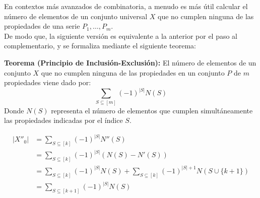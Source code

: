 \documentclass[12pt]{article}
\theoremstyle{definition}
\theoremstyle{plain}
\theoremstyle{plain}
\theoremstyle{definition}
\begin{document}
        En contextos más avanzados de combinatoria, a menudo es más útil calcular el número de elementos de un conjunto universal \(X\) que no cumplen ninguna de las propiedades de una serie \(P_1, \dots, P_m\).\\
        De modo que, la siguiente versión es equivalente a la anterior por el paso al complementario, y se formaliza mediante el siguiente teorema:

        \textbf{Teorema (Principio de Inclusión-Exclusión):}
        El número de elementos de un conjunto $X$ que no cumplen ninguna de las propiedades en un conjunto $P$ de $m$ propiedades viene dado por:$$\sum_{S \subseteq [m]} (-1)^{|S|} N(S)$$Donde $N(S)$ representa el número de elementos que cumplen simultáneamente las propiedades indicadas por el índice $S$.
        
        
        $$\begin{aligned}
            |X''_0| &= \sum_{S \subseteq [k]} (-1)^{|S|} N''(S) \\
            &= \sum_{S \subseteq [k]} (-1)^{|S|} (N(S) - N'(S)) \\
            &= \sum_{S \subseteq [k]} (-1)^{|S|} N(S) + \sum_{S \subseteq [k]} (-1)^{|S|+1} N(S \cup \{k+1\}) \\
            &= \sum_{S \subseteq [k+1]} (-1)^{|S|} N(S)
        \end{aligned}$$
\end{document}
